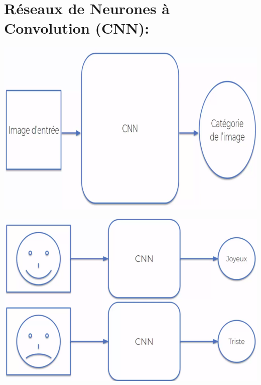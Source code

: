 
\section{Réseaux de Neurones à Convolution (CNN):}
\begin{center}
	\begin{minipage}{0.4\textwidth}
		\begin{flushleft}
			\includegraphics[scale=0.1]{img8.png}
		\end{flushleft}
	\end{minipage}
	\begin{minipage}{0.4\textwidth}
		\begin{flushright}
			\includegraphics[scale=0.1]{img9.png}  
		\end{flushright}
	\end{minipage}
\end{center}
